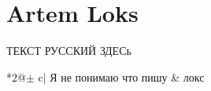 \documentclass[12pt]{article}
\date{\today}
\begin{document}
\section{Artem Loks}
ТЕКСТ РУССКИЙ ЗДЕСь

\begin{tabular}{*{2}{@{$\pm$} c|}}
Я не понимаю что пишу & локс 
\end{tabular}
\end{document}
